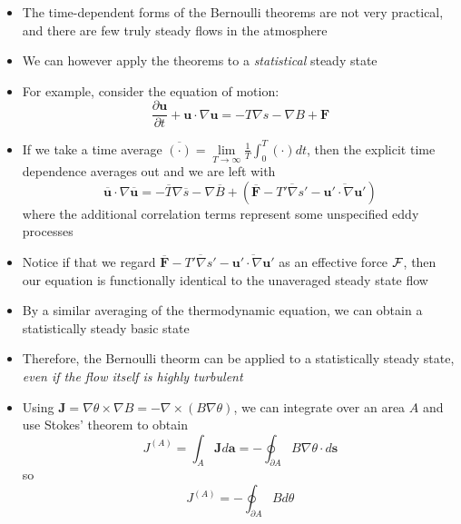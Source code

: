 \documentclass[30pt,landscape]{foils}
\newcommand{\pdiff}[2]{\frac{\partial #1}{\partial #2}}
\begin{document}
\hypersetup{pdfpagetransition=Replace}

\begin{itemize}
  \item The time-dependent forms of the Bernoulli theorems are not very practical, and there are few truly steady flows in the atmosphere

  \item We can however apply the theorems to a \emph{statistical} steady state

  \item For example, consider the equation of motion:
  \begin{equation*}
    \pdiff{\bm{u}}{t} + \bm{u} \cdot \nabla \bm{u} = - T \nabla s - \nabla B + \bm{F}
  \end{equation*}

  \item If we take a time average $\overline{\left(\cdot\right)} = \lim\limits_{T \rightarrow \infty} \frac{1}{T} \int_0^T \left(\cdot\right) dt$, then the explicit time dependence averages out and we are left with
  \begin{equation*}
    \overline{\bm{u}} \cdot \nabla \overline{\bm{u}} = -\overline{T} \nabla \overline{s} - \nabla \overline{B} + \left(\overline{\bm{F}} - \overline{T' \nabla s'} - \overline{\bm{u'} \cdot \nabla \bm{u'}}\right)
  \end{equation*}
  where the additional correlation terms represent some unspecified eddy processes

  \item Notice if that we regard $\overline{\bm{F}} - \overline{T' \nabla s'} - \overline{\bm{u'} \cdot \nabla \bm{u'}}$ as an effective force $\cal{\bm{F}}$, then our equation is functionally identical to the unaveraged steady state flow

  \item By a similar averaging of the thermodynamic equation, we can obtain a statistically steady basic state

  \item Therefore, the Bernoulli theorm can be applied to a statistically steady state, \emph{even if the flow itself is highly turbulent}

\end{itemize}

\hypersetup{pdfpagetransition=Replace}

\begin{itemize}
  \item Using $\bm{J} = \nabla \theta \times \nabla B = - \nabla \times \left(B \nabla \theta \right)$, we can integrate over an area $A$ and use Stokes' theorem to obtain
  \begin{equation*}
  J^{\left(A\right)} = \int_A \bm{J} d\bm{a} = - \oint_{\partial A} B \nabla \theta \cdot d\bm{s}
  \end{equation*}
  so
  \begin{equation*}
    J^{\left(A\right)} = -\oint_{\partial A} B d\theta
  \end{equation*}

\end{itemize}
\end{document}
